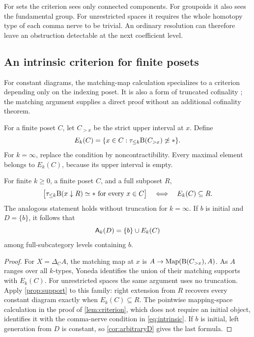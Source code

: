 For sets the criterion sees only connected components. For groupoids it also
sees the fundamental group. For unrestricted spaces it requires the whole
homotopy type of each comma nerve to be trivial. An ordinary resolution can
therefore leave an obstruction detectable at the next coefficient level.

\subsection{An intrinsic criterion for finite posets}
\label{sec:intrinsic}

For constant diagrams, the matching-map calculation specializes to a
criterion depending only on the indexing poset. It is also a form of
truncated cofinality \cite{Du}; the matching argument supplies a direct
proof without an additional cofinality theorem.

For a finite poset $C$, let $C_{>x}$ be the strict upper interval at $x$.
Define
\begin{equation}\label{eq:essentialset}
E_k(C)=\{x\in C:\tau_{\leq k}\mathrm B(C_{>x})\not\simeq *\}.
\end{equation}
For $k=\infty$, replace the condition by noncontractibility. Every
maximal element belongs to $E_k(C)$, because its upper interval is empty.

\begin{theorem}\label{thm:intrinsic}
For finite $k\geq0$, a finite poset $C$, and a full subposet $R$,
\begin{equation}\label{eq:intrinsic}
\bigl[\tau_{\leq k}\mathrm B(x\downarrow R)\simeq *\text{ for every }x\in C\bigr]
\quad\Longleftrightarrow\quad E_k(C)\subseteq R.
\end{equation}
The analogous statement holds without truncation for $k=\infty$.
If $b$ is initial and $D=\{b\}$, it follows that
\begin{equation}\label{eq:generalAufhebung}
\mathsf A_k(D)=\{b\}\cup E_k(C)
\end{equation}
among full-subcategory levels containing $b$.
\end{theorem}

\begin{proof}
For $X=\Delta_C A$, the matching map at $x$ is
$A\to\operatorname{Map}(\mathrm B(C_{>x}),A)$. As $A$ ranges over all $k$-types,
Yoneda identifies the union of their matching supports with $E_k(C)$.
For unrestricted spaces the same argument uses no truncation.
Apply \cref{prop:support} to this family: right extension from $R$
recovers every constant diagram exactly when $E_k(C)\subseteq R$.
The pointwise mapping-space calculation in the proof of
\cref{lem:criterion}, which does not require an initial object,
identifies it with the comma-nerve condition in \eqref{eq:intrinsic}.
If $b$ is initial, left generation
from $D$ is constant, so \cref{cor:arbitraryD} gives the last formula.
\end{proof}

